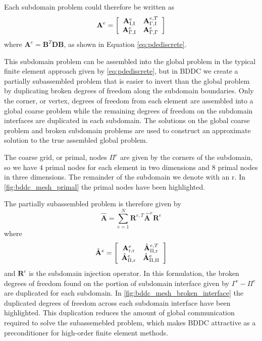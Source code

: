 \documentclass[review]{siamart190516}
\begin{document}
Each subdomain problem could therefore be written as
\begin{equation}
\mathbf{A}^e =
\left[ \begin{array}{c c}
\mathbf{A}_{\text{I}, \text{I}}^e  &  \mathbf{A}_{\Gamma, \text{I}}^{e, T}  \\
\mathbf{A}_{\Gamma, \text{I}}^e    &  \mathbf{A}_{\Gamma, \Gamma}^e         \\
\end{array} \right]
\end{equation}
where $\mathbf{A}^e = \mathbf{B}^T \mathbf{D} \mathbf{B}$, as shown in Equation \ref{eq:pdediscrete}.

This subdomain problem can be assembled into the global problem in the typical finite element approach given by \cref{eq:pdediscrete}, but in BDDC we create a partially subassembled problem that is easier to invert than the global problem by duplicating broken degrees of freedom along the subdomain boundaries.
Only the corner, or vertex, degrees of freedom from each element are assembled into a global coarse problem while the remaining degrees of freedom on the subdomain interfaces are duplicated in each subdomain.
The solutions on the global coarse problem and broken subdomain problems are used to construct an approximate solution to the true assembled global problem.

The coarse grid, or primal, nodes $\Pi^e$ are given by the corners of the subdomain, so we have $4$ primal nodes for each element in two dimensions and $8$ primal nodes in three dimensions.
The remainder of the subdomain we denote with an $\text{r}$.
In \cref{fig:bddc_mesh_primal} the primal nodes have been highlighted.

The partially subassembled problem is therefore given by
\begin{equation}
\hat{\mathbf{A}} = \sum_{e = 1}^N \mathbf{R}^{e, T} \hat{\mathbf{A}}^e \mathbf{R}^e
\label{eq:subassembled}
\end{equation}
where
\begin{equation}
\hat{\mathbf{A}}^e =
\left[ \begin{array}{c c}
\mathbf{A}_{\text{r}, \text{r}}^e  &  \hat{\mathbf{A}}_{\Pi, \text{r}}^{e, T}  \\
\hat{\mathbf{A}}_{\Pi, \text{r}}^e   &  \hat{\mathbf{A}}_{\Pi, \Pi}^e           \\
\end{array} \right]
\end{equation}
and $\mathbf{R}^e$ is the subdomain injection operator. 
In this formulation, the broken degrees of freedom found on the portion of subdomain interface given by $\Gamma^e - \Pi^e$ are duplicated for each subdomain.
In \cref{fig:bddc_mesh_broken_interface} the duplicated degrees of freedom across each subdomain interface have been highlighted.
This duplication reduces the amount of global communication required to solve the subassemebled problem, which makes BDDC attractive as a preconditioner for high-order finite element methods.
\end{document}
